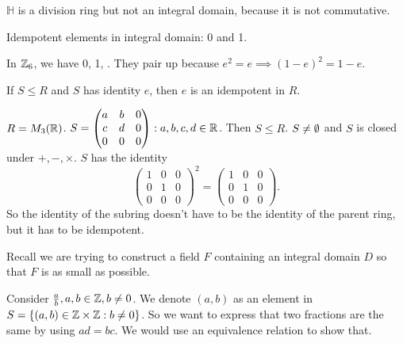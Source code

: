 \documentclass[class=article,crop=false]{standalone}
\begin{document}
\begin{remark}
	$ \mathbb{H}$ is a division ring but not an integral domain, because it is not commutative.
\end{remark}

\begin{remark}
Idempotent elements in integral domain: 0 and 1.

In $ \mathbb{Z}_6$, we have 0, 1, . They pair up because $ e ^2 = e \implies (1-e)^2=1-e$.

If $ S \leq R$ and  $ S$ has identity  $ e$, then  $ e$ is an idempotent in  $ R$.

 \begin{eg}[]
	 $ R=M_3 (\mathbb{R})$. $ S= \begin{pmatrix} a&b&0\\c&d&0\\0&0&0 \end{pmatrix} : a,b,c,d \in \mathbb{R} $. Then $ S\leq R$.  $ S \neq \emptyset$ and $ S$ is closed under  $ +,-,\times $. $ S$ has the identity
	  \[
		  \begin{pmatrix} 1&0&0\\0&1&0\\0&0&0 \end{pmatrix} ^2 =  \begin{pmatrix} 1&0&0\\0&1&0\\0&0&0 \end{pmatrix} 
	 .\]
	 So the identity of the subring doesn't have to be the identity of the parent ring, but it has to be idempotent.
\end{eg}
\end{remark}

Recall we are trying to construct a field $ F$ containing an integral domain  $ D$ so that  $ F$ is as small as possible.

 \begin{intuition}
	 Consider $ \frac{a}{b}, a,b \in \mathbb{Z}, b\neq 0$. We denote $ (a,b)$ as an element in $ S=\{(a,b) \in \mathbb{Z} \times \mathbb{Z}: b\neq 0\} $. So we want to express that two fractions are the same by using $ ad=bc$. We would use an equivalence relation to show that.
\end{intuition}
\end{document}
